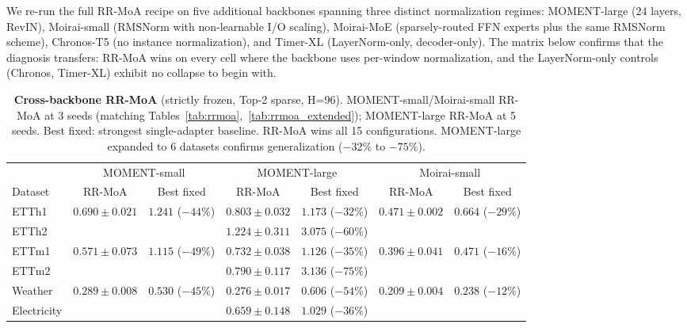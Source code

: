 \documentclass{article}
\begin{document}
We re-run the full RR-MoA recipe on five additional backbones spanning three distinct normalization regimes: MOMENT-large ($24$ layers, RevIN), Moirai-small (RMSNorm with non-learnable I/O scaling), Moirai-MoE (sparsely-routed FFN experts plus the same RMSNorm scheme), Chronos-T5 (no instance normalization), and Timer-XL (LayerNorm-only, decoder-only). The matrix below confirms that the diagnosis transfers: RR-MoA wins on every cell where the backbone uses per-window normalization, and the LayerNorm-only controls (Chronos, Timer-XL) exhibit no collapse to begin with.

\begin{table}[!htbp]
\centering
\caption{\textbf{Cross-backbone RR-MoA} (strictly frozen, Top-2 sparse, H=96). MOMENT-small/Moirai-small RR-MoA at 3 seeds (matching Tables~\ref{tab:rrmoa},~\ref{tab:rrmoa_extended}); MOMENT-large RR-MoA at 5 seeds. Best fixed: strongest single-adapter baseline. RR-MoA wins all 15 configurations. MOMENT-large expanded to 6 datasets confirms generalization ($-32\%$ to $-75\%$).}
\label{tab:cross_backbone}
\footnotesize
\begin{tabular}{@{}lcccccc@{}}
\toprule
 & \multicolumn{2}{c}{MOMENT-small} & \multicolumn{2}{c}{MOMENT-large} & \multicolumn{2}{c}{Moirai-small} \\
\cmidrule(lr){2-3} \cmidrule(lr){4-5} \cmidrule(lr){6-7}
Dataset & RR-MoA & Best fixed & RR-MoA & Best fixed & RR-MoA & Best fixed \\
\midrule
ETTh1       & $0.690{\pm}0.021$ & $1.241$ {\scriptsize($-44\%$)} & $0.803{\pm}0.032$ & $1.173$ {\scriptsize($-32\%$)} & $\mathbf{0.471{\pm}0.002}$ & $0.664$ {\scriptsize($-29\%$)} \\
ETTh2       & & & $1.224{\pm}0.311$ & $3.075$ {\scriptsize($-60\%$)} & & \\
ETTm1       & $0.571{\pm}0.073$ & $1.115$ {\scriptsize($-49\%$)} & $0.732{\pm}0.038$ & $1.126$ {\scriptsize($-35\%$)} & $\mathbf{0.396{\pm}0.041}$ & $0.471$ {\scriptsize($-16\%$)} \\
ETTm2       & & & $0.790{\pm}0.117$ & $3.136$ {\scriptsize($-75\%$)} & & \\
Weather     & $0.289{\pm}0.008$ & $0.530$ {\scriptsize($-45\%$)} & $0.276{\pm}0.017$ & $0.606$ {\scriptsize($-54\%$)} & $\mathbf{0.209{\pm}0.004}$ & $0.238$ {\scriptsize($-12\%$)} \\
Electricity & & & $0.659{\pm}0.148$ & $1.029$ {\scriptsize($-36\%$)} & & \\
\bottomrule
\end{tabular}
\end{table}
\end{document}
